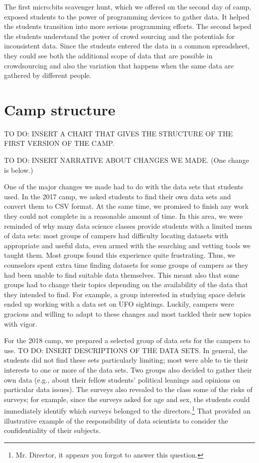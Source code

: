 The first micro:bits scavenger hunt, which we offered on the second
day of camp, exposed students to the power of programming devices
to gather data.  It helped the students transition into more serious
programming efforts.  The second heped the students understand the
power of crowd sourcing and the potentials for inconsistent data.
Since the students entered the data in a common spreadsheet, they could
see both the additional scope of data that are possible in crowdsourcing
and also the variation that happens when the same data are gathered by
different people.

\section{Camp structure}

TO DO: INSERT A CHART THAT GIVES THE STRUCTURE OF THE FIRST VERSION OF
THE CAMP.

TO DO: INSERT NARRATIVE ABOUT CHANGES WE MADE.  (One change is below.)

One of the major changes we made had to do with the data sets that students
used.  In the 2017 camp, we asked students to find their own data sets and
convert them to CSV format.  At the same time, we promised to finish any
work they could not complete in a reasonable amount of time.
In this area, we were reminded of why many data science classes
provide students with a limited menu of data sets: most groups of
campers had difficulty locating datasets with appropriate and useful
data, even armed with the searching and vetting tools we taught
them.  Most groups found this experience quite frustrating.  Thus,
we counselors spent extra time finding datasets for some groups of
campers as they had been unable to find suitable data themselves.
This meant also that some groups had to change their topics depending
on the availability of the data that they intended to find.  For
example, a group interested in studying space debris ended up working
with a data set on UFO sightings.  Luckily, campers were gracious
and willing to adapt to these changes and most tackled their new
topics with vigor.

For the 2018 camp, we prepared a selected group of data sets for
the campers to use.  TO DO: INSERT DESCRIPTIONS OF THE DATA SETS.
In general, the students did not find these sets particularly
limiting; most were able to tie their interests to one or more of
the data sets.  Two groups also decided to gather their own data
(e.g., about their fellow students' political leanings and opinions
on particular data issues).  The surveys also revealed to the class
some of the risks of surveys; for example, since the surveys asked
for age and sex, the students could immediately identify which
surveys belonged to the directors.\footnote{Mr. Director, it appears
you forgot to answer this question.}  That provided an illustrative
example of the responsibility of data scientists to consider the
confidentiality of their subjects.

